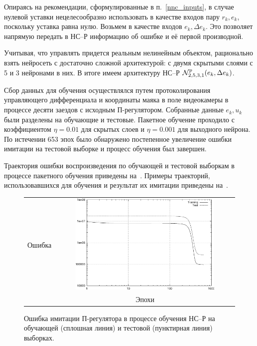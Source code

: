 
Опираясь на рекомендации, сформулированные в п.~\ref{nnc_inputs}, в
случае нулевой уставки нецелесообразно использовать в качестве входов
пару $r_k,e_k$, поскольку уставка равна нулю.  Возьмем в качестве
входов $e_k,\Delta e_k$.  Это позволяет напрямую передать в НС--Р
информацию об ошибке и её первой производной.

Учитывая, что управлять придется реальным нелинейным объектом,
рационально взять нейросеть с достаточно сложной архитектурой: с двумя
скрытыми слоями с 5 и 3 нейронами в них.  В итоге имеем архитектуру
НС--Р $\mathcal{N}^p_{2,5,3,1}(e_k,\Delta e_k)$.

Сбор данных для обучения осуществлялся путем протоколирования
управляющего дифференциала и координаты маяка в поле видеокамеры в
процессе десяти заездов с исходным П-регулятором.  Собранные данные
${e_k,u_k}$ были разделены на обучающие и тестовые.  Пакетное обучение
проходило с коэффициентом $\eta=0.01$ для скрытых слоев и $\eta=0.001$
для выходного нейрона.  По истечении 653 эпох было обнаружено
постепенное увеличение ошибки имитации на тестовой выборке и процесс
обучения был завершен.

Траектория ошибки воспроизведения по обучающей и тестовой выборкам в
процессе пакетного обучения приведены
на~.  Примеры траекторий,
использовавшихся для обучения и результат их имитации приведены
на~.

\begin{figure}
\centering
  \begin{tabular}{rc}
    \begin{sideways}
      {\hspace{4cm}\small Ошибка}
    \end{sideways}
    &
    \includegraphics[width=0.8\textwidth,%
                     totalheight=0.35\textheight]{moby_nnc_pretr_training}\\
    & {\small Эпохи} \\
\end{tabular}
\caption{Ошибка имитации П-регулятора в процессе обучения НС--Р на
обучающей (сплошная линия) и тестовой (пунктирная линия) выборках.}
\label{fig:moby_nnc_pretr_training}
\end{figure}

